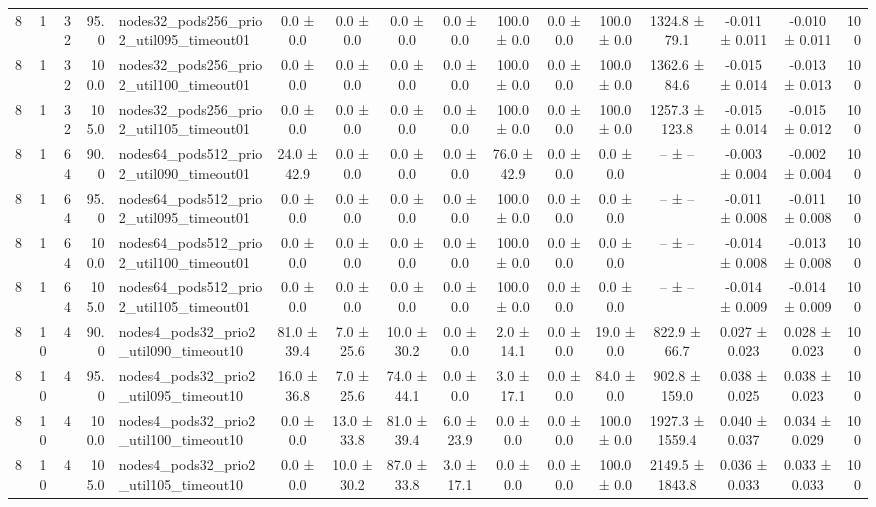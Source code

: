 \begin{tabular}{r r r r l c c c c c c c c c c r}
8 & 1 & 32 & 95.0 & nodes32\_pods256\_prio2\_util095\_timeout01 & 0.0 ± 0.0 & 0.0 ± 0.0 & 0.0 ± 0.0 & 0.0 ± 0.0 & 100.0 ± 0.0 & 0.0 ± 0.0 & 100.0 ± 0.0 & 1324.8 ± 79.1 & -0.011 ± 0.011 & -0.010 ± 0.011 & 100 \\
8 & 1 & 32 & 100.0 & nodes32\_pods256\_prio2\_util100\_timeout01 & 0.0 ± 0.0 & 0.0 ± 0.0 & 0.0 ± 0.0 & 0.0 ± 0.0 & 100.0 ± 0.0 & 0.0 ± 0.0 & 100.0 ± 0.0 & 1362.6 ± 84.6 & -0.015 ± 0.014 & -0.013 ± 0.013 & 100 \\
8 & 1 & 32 & 105.0 & nodes32\_pods256\_prio2\_util105\_timeout01 & 0.0 ± 0.0 & 0.0 ± 0.0 & 0.0 ± 0.0 & 0.0 ± 0.0 & 100.0 ± 0.0 & 0.0 ± 0.0 & 100.0 ± 0.0 & 1257.3 ± 123.8 & -0.015 ± 0.014 & -0.015 ± 0.012 & 100 \\
8 & 1 & 64 & 90.0 & nodes64\_pods512\_prio2\_util090\_timeout01 & 24.0 ± 42.9 & 0.0 ± 0.0 & 0.0 ± 0.0 & 0.0 ± 0.0 & 76.0 ± 42.9 & 0.0 ± 0.0 & 0.0 ± 0.0 & -- ± -- & -0.003 ± 0.004 & -0.002 ± 0.004 & 100 \\
8 & 1 & 64 & 95.0 & nodes64\_pods512\_prio2\_util095\_timeout01 & 0.0 ± 0.0 & 0.0 ± 0.0 & 0.0 ± 0.0 & 0.0 ± 0.0 & 100.0 ± 0.0 & 0.0 ± 0.0 & 0.0 ± 0.0 & -- ± -- & -0.011 ± 0.008 & -0.011 ± 0.008 & 100 \\
8 & 1 & 64 & 100.0 & nodes64\_pods512\_prio2\_util100\_timeout01 & 0.0 ± 0.0 & 0.0 ± 0.0 & 0.0 ± 0.0 & 0.0 ± 0.0 & 100.0 ± 0.0 & 0.0 ± 0.0 & 0.0 ± 0.0 & -- ± -- & -0.014 ± 0.008 & -0.013 ± 0.008 & 100 \\
8 & 1 & 64 & 105.0 & nodes64\_pods512\_prio2\_util105\_timeout01 & 0.0 ± 0.0 & 0.0 ± 0.0 & 0.0 ± 0.0 & 0.0 ± 0.0 & 100.0 ± 0.0 & 0.0 ± 0.0 & 0.0 ± 0.0 & -- ± -- & -0.014 ± 0.009 & -0.014 ± 0.009 & 100 \\
8 & 10 & 4 & 90.0 & nodes4\_pods32\_prio2\_util090\_timeout10 & 81.0 ± 39.4 & 7.0 ± 25.6 & 10.0 ± 30.2 & 0.0 ± 0.0 & 2.0 ± 14.1 & 0.0 ± 0.0 & 19.0 ± 0.0 & 822.9 ± 66.7 & 0.027 ± 0.023 & 0.028 ± 0.023 & 100 \\
8 & 10 & 4 & 95.0 & nodes4\_pods32\_prio2\_util095\_timeout10 & 16.0 ± 36.8 & 7.0 ± 25.6 & 74.0 ± 44.1 & 0.0 ± 0.0 & 3.0 ± 17.1 & 0.0 ± 0.0 & 84.0 ± 0.0 & 902.8 ± 159.0 & 0.038 ± 0.025 & 0.038 ± 0.023 & 100 \\
8 & 10 & 4 & 100.0 & nodes4\_pods32\_prio2\_util100\_timeout10 & 0.0 ± 0.0 & 13.0 ± 33.8 & 81.0 ± 39.4 & 6.0 ± 23.9 & 0.0 ± 0.0 & 0.0 ± 0.0 & 100.0 ± 0.0 & 1927.3 ± 1559.4 & 0.040 ± 0.037 & 0.034 ± 0.029 & 100 \\
8 & 10 & 4 & 105.0 & nodes4\_pods32\_prio2\_util105\_timeout10 & 0.0 ± 0.0 & 10.0 ± 30.2 & 87.0 ± 33.8 & 3.0 ± 17.1 & 0.0 ± 0.0 & 0.0 ± 0.0 & 100.0 ± 0.0 & 2149.5 ± 1843.8 & 0.036 ± 0.033 & 0.033 ± 0.033 & 100 \\

\end{tabular}
